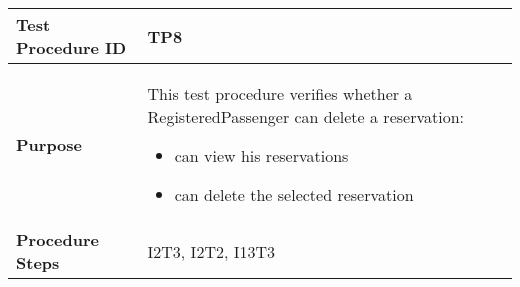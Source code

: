 			\vspace{1cm}
			\begin{tabular}{p{4cm} | p{8cm}} \hline
				\textbf{Test Procedure ID} & TP8 \\ \hline
				\textbf{Purpose} & This test procedure verifies whether a RegisteredPassenger can delete a reservation:
				\begin{itemize}
					\item can view his reservations
					\item can delete the selected reservation
				\end{itemize}
				\\ \hline
				\textbf{Procedure Steps} & I2T3, I2T2, I13T3\\ \hline
			\end{tabular}
